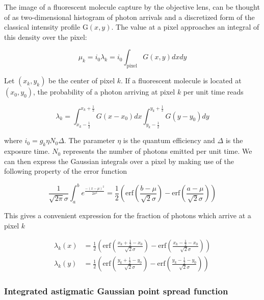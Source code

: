 \documentclass{ucetd}
\begin{document}
The image of a fluorescent molecule capture by the objective lens, can be thought of as two-dimensional histogram of photon arrivals and a discretized form of the classical intensity profile $\mathrm{G}(x,y)$. The value at a pixel approaches an integral of this density over the pixel:

\begin{equation}
\mu_{k} = i_{0}\lambda_{k} = i_{0}\int_{\mathrm{pixel}} G(x,y)dxdy
\end{equation}

Let $(x_{k},y_{k})$ be the center of pixel $k$. If a fluorescent molecule is located at $(x_{0},y_{0})$, the probability of a photon arriving at pixel $k$ per unit time reads

\begin{equation*}
\lambda_{k} = \int_{x_{k}-\frac{1}{2}}^{x_{k}+\frac{1}{2}}G(x-x_{0})dx \int_{y_{k}-\frac{1}{2}}^{y_{k}+\frac{1}{2}} G(y-y_{0})dy
\end{equation*}

\vspace{0.2in}
where $i_{0} = g_{k}\eta N_{0}\Delta$. The parameter $\eta$ is the quantum efficiency and $\Delta$ is the exposure time. $N_{0}$ represents the number of photons emitted per unit time. We can then express the Gaussian integrals over a pixel by making use of the following property of the error function

\begin{equation*}
\frac{1}{\sqrt{2\pi}\sigma}\int_{a}^{b} e^{\frac{-(x-\mu)^{2}}{2\sigma^{2}}} = \frac{1}{2}\left(\mathrm{erf}\left(\frac{b-\mu}{\sqrt{2}\sigma}\right) -\mathrm{erf}\left(\frac{a-\mu}{\sqrt{2}\sigma}\right)\right)
\end{equation*}

This gives a convenient expression for the fraction of photons which arrive at a pixel $k$

\begin{align*}
\lambda_{k}(x) &= \frac{1}{2}\left(\mathrm{erf}\left(\frac{x_{k}+\frac{1}{2}-x_{0}}{\sqrt{2}\sigma}\right) -\mathrm{erf}\left(\frac{x_{k}-\frac{1}{2}-x_{0}}{\sqrt{2}\sigma}\right)\right)\\
\lambda_{k}(y) &= \frac{1}{2}\left(\mathrm{erf}\left(\frac{y_{k}+\frac{1}{2}-y_{0}}{\sqrt{2}\sigma}\right) -\mathrm{erf}\left(\frac{y_{k}-\frac{1}{2}-y_{0}}{\sqrt{2}\sigma}\right)\right)
\end{align*}

\subsubsection{Integrated astigmatic Gaussian point spread function}
\end{document}
